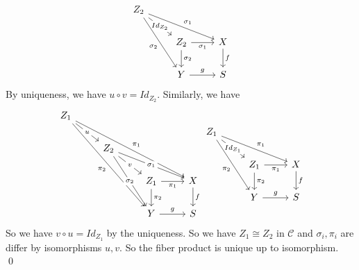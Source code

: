 \documentclass[12pt]{amsart}
\begin{document}
\[ \begin{tikzcd}
        Z_2 \arrow[rd, "Id_{Z_2}" description] \arrow[rrd, "\sigma_1"] \arrow[rdd, "\sigma_2"'] &                                                     &     \\
        & Z_2 \arrow[r, "\sigma_1"'] \arrow[d, "\sigma_2"] & X \arrow[d, "f"]\\
        & Y \arrow[r,"g"]                                                 & S
    \end{tikzcd}\]
By uniqueness, we have $u\circ v= Id_{Z_2}$. Similarly, we have
\[
    \begin{tikzcd}
        Z_1 \arrow[rd, "u" description] \arrow[rrrdd, "\pi_1"] \arrow[rrddd, "\pi_2"'] &                                                                                                   &                                                  &                  \\
        & Z_2 \arrow[rd, "v" description] \arrow[rrd, "\sigma_1" description] \arrow[rdd, "\sigma_2" description] &                                                  &                  \\
        &                                                                                                   & Z_1 \arrow[r, "\pi_1"'] \arrow[d, "\pi_2"] & X \arrow[d, "f"] \\
        &                                                                                                   & Y \arrow[r, "g"]                                 & S
    \end{tikzcd}
    \begin{tikzcd}
        Z_1 \arrow[rd, "Id_{Z_1}" description] \arrow[rrd, "\pi_1"] \arrow[rdd, "\pi_2"'] &                                                     &     \\
        & Z_1 \arrow[r, "\pi_1"'] \arrow[d, "\pi_2"] & X \arrow[d, "f"]\\
        & Y \arrow[r,"g"]                                                 & S
    \end{tikzcd}
\]
So we have $v\circ u=Id_{Z_1}$ by the uniqueness. So we have $Z_1\cong Z_2$ in $\mathcal{C}$ and $\sigma_i,\pi_i$ are differ by isomorphisms $u,v$. So the fiber product is unique up to isomorphism. \\\qed
\end{document}
